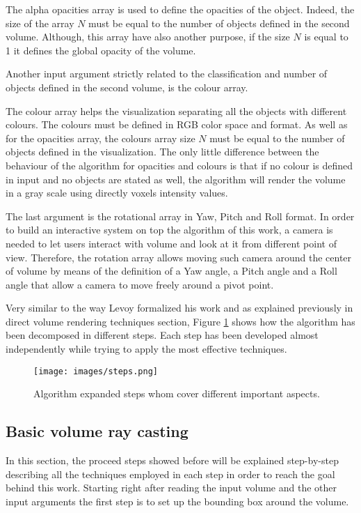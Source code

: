 \documentclass[12pt,a4paper]{extarticle}
\newcommand{\linespace}{\vspace{8pt}}
\begin{document}
The alpha opacities array is used to define the opacities of the object. Indeed, the size of the array $N$ must be equal to the number of objects defined in the second volume. 
Although, this array have also another purpose, if the size $N$ is equal to 1 it defines the global opacity of the volume.

Another input argument strictly related to the classification and number of objects defined in the second volume, is the colour array.
\linespace

The colour array helps the visualization separating all the objects with different colours. The colours must be defined in RGB color space and format.
As well as for the opacities array, the colours array size $N$ must be equal to the number of objects defined in the visualization. The only little difference between the behaviour of the algorithm for opacities and colours is that if no colour is defined in input and no objects are stated as well, the algorithm will render the volume in a gray scale using directly voxels intensity values. 
\linespace

The last argument is the rotational array in Yaw, Pitch and Roll format. In order to build an interactive system on top the algorithm of this work, a camera is needed to let users interact with volume and look at it from different point of view. Therefore, the rotation array allows moving such camera around the center of volume by means of the definition of a Yaw angle, a Pitch angle and a Roll angle that allow a camera to move freely around a pivot point.
\linespace

Very similar to the way Levoy formalized his work and as explained previously in direct volume rendering techniques section,
Figure \ref{fig:steps} shows how the algorithm has been decomposed in different steps. Each step has been developed almost independently while trying to apply the most effective techniques.


\begin{figure}[hbtp]
\centering
\texttt{[image: images/steps.png]}
\caption{Algorithm expanded steps whom cover different important aspects.}
\label{fig:steps}
\end{figure}

\subsection{Basic volume ray casting} 
In this section, the proceed steps showed before will be explained step-by-step describing all the techniques employed in each step in order to reach the goal behind this work.
Starting right after reading the input volume and the other input arguments the first step is to set up the bounding box around the volume.
\end{document}
